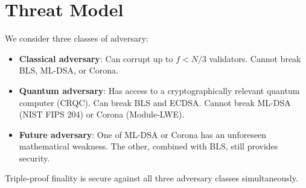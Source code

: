 \section{Threat Model}


We consider three classes of adversary:

\begin{itemize}[leftmargin=2em]
\item \textbf{Classical adversary}: Can corrupt up to $f < N/3$ validators. Cannot break BLS, ML-DSA, or Corona.
\item \textbf{Quantum adversary}: Has access to a cryptographically relevant quantum computer (CRQC). Can break BLS and ECDSA. Cannot break ML-DSA (NIST FIPS 204) or Corona (Module-LWE).
\item \textbf{Future adversary}: One of ML-DSA or Corona has an unforeseen mathematical weakness. The other, combined with BLS, still provides security.
\end{itemize}

Triple-proof finality is secure against all three adversary classes simultaneously.

